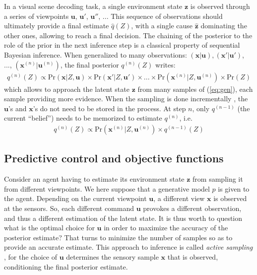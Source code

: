 \documentclass[12pt,twoside,openright]{article}
\begin{document}
{\color{Purple} In a visual scene decoding task, a single environment state $\boldsymbol{z}$ is
observed through a series of viewpoints $\boldsymbol{u}$, $\boldsymbol{u}'$, $\boldsymbol{u}''$, ... This sequence of observations should ultimately provide a final estimate $\hat{q}(Z)$, with a single cause $\hat{\boldsymbol{z}}$ dominating the other ones, allowing to reach a final decision. }
The chaining of the posterior to the role of the prior in the next inference step is a classical property of sequential Bayesian inference.
When generalized to many observations: $(\boldsymbol{x}|\boldsymbol{u}), (\boldsymbol{x}'|\boldsymbol{u}')$, ..., $(\boldsymbol{x}^{(n)}|\boldsymbol{u}^{(n)})$, the final posterior $q^{(n)}(Z)$ writes:
\begin{align}
q^{(n)}(Z) \propto \text{Pr}(\boldsymbol{x}|Z,\boldsymbol{u}) \times \text{Pr}(\boldsymbol{x}'|Z,\boldsymbol{u}') \times ... \times \text{Pr}(\boldsymbol{x}^{(n)}|Z,\boldsymbol{u}^{(n)}) \times \text{Pr}(Z) \label{eq:accum}
\end{align}
which allows to approach the latent state $\boldsymbol{z}$ from many samples of (\ref{eq:gen}), each sample providing more evidence. 
{\color{Purple} When the sampling is done incrementally \citep{wald1945sequential},}
the $\boldsymbol{u}$'s and $\boldsymbol{x}$'s do not need to be stored in the process. At step $n$, only $q^{(n-1)}$ (the current ``belief'') needs to be memorized to estimate $q^{(n)}$, i.e. 
\begin{align} 
q^{(n)}(Z) \propto \text{Pr}(\boldsymbol{x}^{(n)}|Z,\boldsymbol{u}^{(n)}) \times q^{(n-1)}(Z) \label{eq:accum-post}
\end{align}

\subsection{Predictive control and objective functions}\label{sec:perception-driven-control}


Consider an agent having to estimate its environment state $\boldsymbol{z}$ from sampling it from different viewpoints. We here suppose that a generative model $p$ is given to the agent. 
Depending on  the current viewpoint $\boldsymbol{u}$, a different view $\boldsymbol{x}$ is observed at the sensors. So, each different command $\boldsymbol{u}$ provokes a different observation, and thus a different 
estimation of the latent state. It is thus worth to question what is the optimal choice for $\boldsymbol{u}$ in order to maximize the accuracy of the posterior estimate?
That turns  to minimize the number of samples so as to provide an accurate estimate. This approach to inference is called \emph{active sampling} \citep{friston2012perceptions}, for the choice of $\boldsymbol{u}$ determines the sensory sample $\boldsymbol{x}$ that is observed, conditioning the final posterior estimate.
\end{document}
